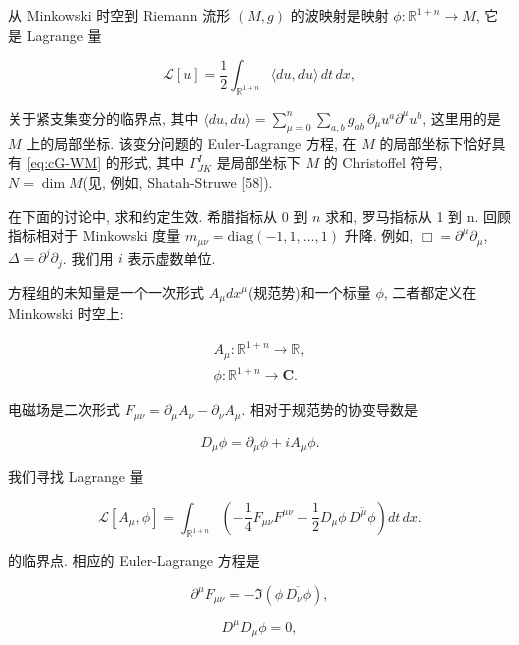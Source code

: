 
从 Minkowski 时空到 Riemann 流形 $(M, g)$ 的波映射是映射 $\phi:\mathbb{R}^{1+n}\to M$, 它是 Lagrange 量

\[
\mathcal{L}[u] = \frac{1}{2}\int_{\mathbb{R}^{1+n}}\langle du,  du\rangle\, dt\, dx, 
\]

关于紧支集变分的临界点, 其中 $\langle du,  du\rangle = \sum_{\mu=0}^{n}\sum_{a, b} g_{ab}\, \partial_{\mu}u^{a}\partial^{\mu}u^{b}$, 这里用的是 $M$ 上的局部坐标. 该变分问题的 Euler-Lagrange 方程, 在 $M$ 的局部坐标下恰好具有 \eqref{eq:cG-WM} 的形式, 其中 $\Gamma_{JK}^{I}$ 是局部坐标下 $M$ 的 Christoffel 符号, $N = \dim M$(见, 例如, Shatah-Struwe {[}58{]}). 


在下面的讨论中, 求和约定生效. 希腊指标从 0 到 $n$ 求和, 罗马指标从 1 到 n. 回顾指标相对于 Minkowski 度量 $m_{\mu\nu} = \text{diag}(-1,  1,  \ldots,  1)$ 升降. 例如, $\Box = \partial^{\mu}\partial_{\mu}$, $\Delta = \partial^{j}\partial_{j}$. 我们用 $i$ 表示虚数单位. 

方程组的未知量是一个一次形式 $A_{\mu}dx^{\mu}$(规范势)和一个标量 $\phi$, 二者都定义在 Minkowski 时空上:

\[
\begin{array}{c}
A_{\mu}: \mathbb{R}^{1+n} \to \mathbb{R},  \\
\phi: \mathbb{R}^{1+n} \to \mathbf{C}.
\end{array}
\]

电磁场是二次形式 $F_{\mu\nu} = \partial_{\mu}A_{\nu} - \partial_{\nu}A_{\mu}$. 相对于规范势的协变导数是

\[
D_{\mu}\phi = \partial_{\mu}\phi + iA_{\mu}\phi.
\]

我们寻找 Lagrange 量

\[
\mathcal{L}\left[A_{\mu},  \phi\right] = \int_{\mathbb{R}^{1+n}}\left(-\frac{1}{4}F_{\mu\nu}F^{\mu\nu} - \frac{1}{2}D_{\mu}\phi\, \overline{D^{\mu}\phi}\right)dt\, dx.
\]

的临界点. 相应的 Euler-Lagrange 方程是

\begin{equation}
\partial^{\mu}F_{\mu\nu} = -\Im\left(\phi\, \overline{D_{\nu}\phi}\right), \tag{MKGa}\label{eq:cG-MKGa}
\end{equation}

\begin{equation}
D^{\mu}D_{\mu}\phi = 0, \tag{MKGb}\label{eq:cG-MKGb}
\end{equation}

